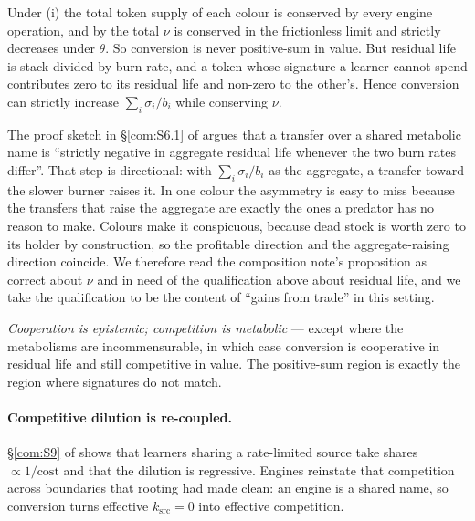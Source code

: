 \begin{proposition}\label{eng:prop:nomet2}
Under (i) the total token supply of each colour is conserved by every
engine operation, and by \cite[Prop.~5.1]{vtok} the total $\nu$ is
conserved in the frictionless limit and strictly decreases under $\theta$.
So conversion is never positive-sum in value. But residual life is stack
divided by burn rate, and a token whose signature a learner cannot spend
contributes zero to its residual life and non-zero to the other's. Hence
conversion can strictly increase $\sum_i \sigma_i / b_i$ while conserving
$\nu$.
\end{proposition}

\begin{remark}\label{eng:honest-gap-source}
The proof sketch in \S\ref{com:S6.1} of \chComp argues that a transfer over a
shared metabolic name is ``strictly negative in aggregate residual life
whenever the two burn rates differ''. That step is directional: with
$\sum_i \sigma_i/b_i$ as the aggregate, a transfer toward the slower burner
raises it. In one colour the asymmetry is easy to miss because the
transfers that raise the aggregate are exactly the ones a predator has no
reason to make. Colours make it conspicuous, because dead stock is worth
zero to its holder by construction, so the profitable direction and the
aggregate-raising direction coincide. We therefore read the composition
note's proposition as correct about $\nu$ and in need of the qualification
above about residual life, and we take the qualification to be the content
of ``gains from trade'' in this setting.
\end{remark}

\begin{corollary}\label{eng:slogan-amended}
\emph{Cooperation is epistemic; competition is metabolic} --- except where
the metabolisms are incommensurable, in which case conversion is
cooperative in residual life and still competitive in value. The
positive-sum region is exactly the region where signatures do not match.
\end{corollary}

\paragraph{Competitive dilution is re-coupled.} \S\ref{com:S9} of \chComp shows
that learners sharing a rate-limited source take shares $\propto 1/\text{cost}$
and that the dilution is regressive. Engines reinstate that competition
across boundaries that rooting had made clean: an engine is a shared name,
so conversion turns effective $k_{\mathrm{src}} = 0$ into effective
competition.

